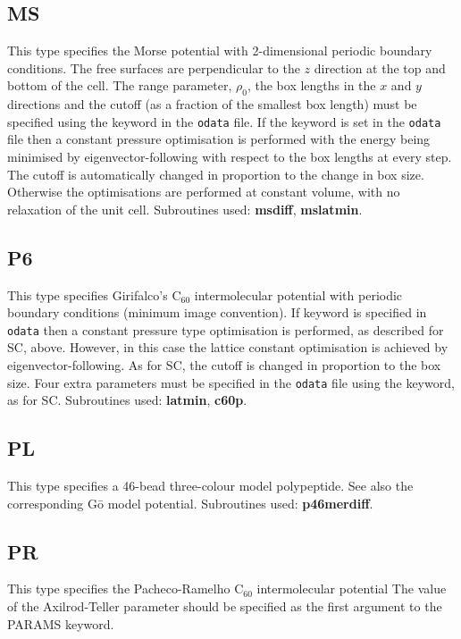 {{{\subsection{MS}This type specifies the Morse potential with 2-dimensional
periodic boundary conditions.
The free surfaces are perpendicular to the $z$ direction at the top and bottom
of the cell.
The range parameter, $\rho_0$, the box lengths in the $x$ and $y$ 
directions and the cutoff (as a fraction of the smallest box length)
must be specified using the {} keyword in the {\tt odata} file.
If the keyword {} is set in the {\tt odata} file
then a constant pressure optimisation is performed
with the energy being minimised by eigenvector-following with respect to the 
box lengths at every step. 
The cutoff is automatically changed in proportion to the change in box size.
Otherwise the optimisations are performed at constant volume, with no 
relaxation of the unit cell. 
Subroutines used: {\bf msdiff}, {\bf mslatmin}.

\subsection{P6}This type specifies Girifalco's C$_{60}$ intermolecular potential\cite{girifalco92}
with periodic boundary conditions (minimum image convention\cite{allent87}). If keyword
{} is specified in {\tt odata}
then a constant pressure type optimisation is performed,
as described for SC, above. However, in this case the lattice constant optimisation is
achieved by eigenvector-following. As for SC, the cutoff is changed in proportion to
the box size. Four extra parameters must be specified in the {\tt odata} file using the
{} keyword,
as for SC. Subroutines used: {\bf latmin}, {\bf c60p}.

\subsection{PL}This type specifies a 46-bead three-colour model polypeptide. 
See also the corresponding G\={o} model potential.
Subroutines used: {\bf p46merdiff}.

\subsection{PR}This type specifies the Pacheco-Ramelho C$_{60}$ intermolecular potential\cite{pachecor97}
The value of the Axilrod-Teller parameter should be specified as the first argument to the
PARAMS keyword.

}}}
